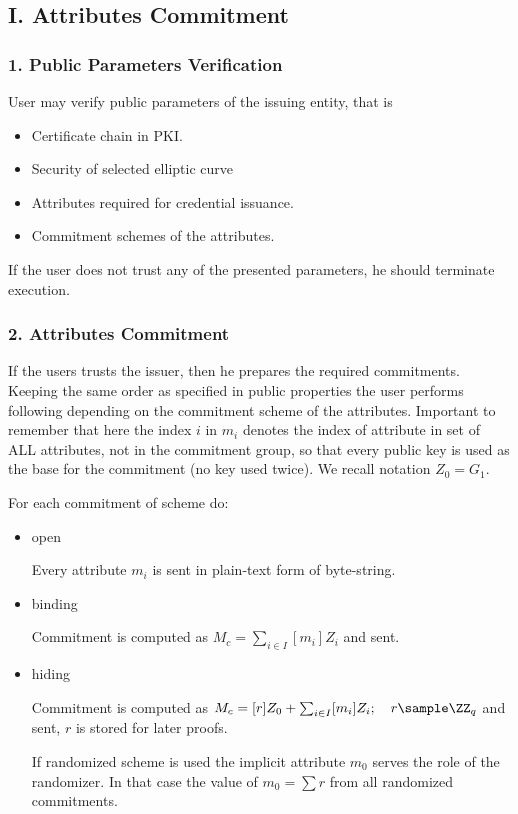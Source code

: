 \subsection*{I. Attributes Commitment}

\subsubsection*{1. Public Parameters Verification}
User may verify public parameters of the issuing entity, that is
\begin{itemize}[label=$\circ$]
    \item Certificate chain in PKI.
    \item Security of selected elliptic curve
    \item Attributes required for credential issuance.
    \item Commitment schemes of the attributes.
\end{itemize}
If the user does not trust any of the presented parameters, he should terminate execution.

\subsubsection*{2. Attributes Commitment}
If the users trusts the issuer, then he prepares the required commitments. Keeping the same order as specified in public properties the user performs following depending on the commitment scheme of the attributes. Important to remember that here the index $i$ in $m_i$ denotes the index of attribute in set of ALL attributes, not in the commitment group, so that every public key is used as the base for the commitment (no key used twice). We recall notation $Z_0 = G_1$.

For each commitment of scheme do:
\begin{itemize}[label=$\circ$]
    \item \textsf{open}
    
    Every attribute $m_i$ is sent in plain-text form of byte-string.
    
    \item \textsf{binding}
    
    Commitment is computed as $M_c = \sum_{i \in I} [m_i]Z_i$ and sent.
    
    \item \textsf{hiding}
    
    Commitment is computed as $M_c = [r]Z_0 + \sum_{i \in I} [m_i]Z_i; \quad r \sample \ZZ_q$ and sent, $r$ is stored for later proofs.
    
    If \textsf{randomized} scheme is used the implicit attribute $m_0$ serves the role of the randomizer. In that case the value of $m_0 = \sum r$ from all randomized commitments.
\end{itemize}

